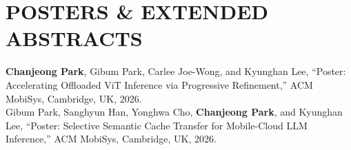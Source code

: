 \section*{POSTERS \& EXTENDED ABSTRACTS}

\noindent
\textbf{Chanjeong Park}, Gibum Park, Carlee Joe-Wong, and Kyunghan Lee, 
``Poster: Accelerating Offloaded ViT Inference via Progressive Refinement,''
ACM MobiSys, Cambridge, UK, 2026. \\

\noindent
Gibum Park, Sanghyun Han, Yonghwa Cho, \textbf{Chanjeong Park}, and Kyunghan Lee, 
``Poster: Selective Semantic Cache Transfer for Mobile-Cloud LLM Inference,''
ACM MobiSys, Cambridge, UK, 2026.
